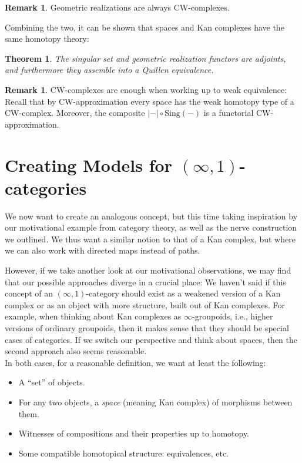 \documentclass{article}
\newtheorem{thm}[subsection]{Theorem}
\theoremstyle{definition}
\newtheorem{rem}[subsection]{Remark}
\begin{document}
\begin{rem}
    Geometric realizations are always CW-complexes.
\end{rem}

Combining the two, it can be shown that spaces and Kan complexes have the same homotopy theory:

\begin{thm}
    The singular set and geometric realization functors are adjoints, and furthermore they assemble into a Quillen equivalence.
\end{thm}

\begin{rem}
    CW-complexes are enough when working up to weak equivalence: Recall that by CW-approximation every space has the weak homotopy type of a CW-complex. Moreover, the composite $|-|\circ \text{Sing}(-)$ is a functorial CW-approximation.
\end{rem}

\section{Creating Models for $(\infty,1)$-categories}

We now want to create an analogous concept, but this time taking inspiration by our motivational example from category theory, as well as the nerve construction we outlined. We thus want a similar notion to that of a Kan complex, but where we can also work with directed maps instead of paths. 
\par However, if we take another look at our motivational observations, we may find that our possible approaches diverge in a crucial place: We haven't said if this concept of an $(\infty,1)$-category should exist as a weakened version of a Kan complex or as an object with more structure, built out of Kan complexes. For example, when thinking about Kan complexes as $\infty$-groupoids, i.e., higher versions of ordinary groupoids, then it makes sense that they should be special cases of categories. If we switch our perspective and think about spaces, then the second approach also seems reasonable. \\ 
In both cases, for a reasonable definition, we want at least the following:
\begin{itemize}
    \item A ``set'' of objects.
    \item For any two objects, a \textit{space} (meaning Kan complex) of morphisms between them.
    \item Witnesses of compositions and their properties up to homotopy.
    \item Some compatible homotopical structure: equivalences, etc.
\end{itemize}
\end{document}
